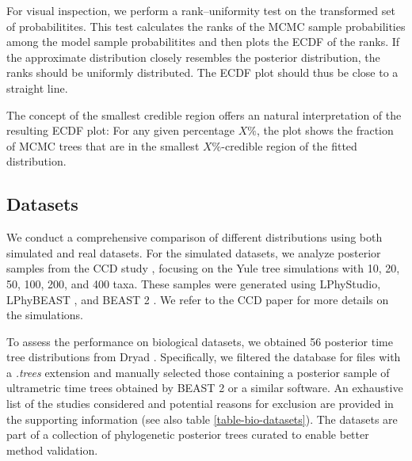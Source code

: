 \documentclass[10pt,letterpaper]{article}
\begin{document}
For visual inspection, we perform a rank–uniformity test \cite{bayesianmodelvalidation} on the transformed set of probabilitites. This test calculates the ranks of the MCMC sample probabilities among the model sample probabilitites and then plots the ECDF of the ranks. If the approximate distribution closely resembles the posterior distribution, the ranks should be uniformly distributed. The ECDF plot should thus be close to a straight line.

The concept of the smallest credible region offers an natural interpretation of the resulting ECDF plot: For any given percentage $X \%$, the plot shows the fraction of MCMC trees that are in the smallest $X \%$-credible region of the fitted distribution.


\subsection*{Datasets}

We conduct a comprehensive comparison of different distributions using both simulated and real datasets. For the simulated datasets, we analyze posterior samples from the CCD study \cite{ccddata}, focusing on the Yule tree simulations with 10, 20, 50, 100, 200, and 400 taxa. These samples were generated using LPhyStudio, LPhyBEAST \cite{linguaphylo}, and BEAST 2 \cite{beast2}. We refer to the CCD paper \cite{ccd} for more details on the simulations.

To assess the performance on biological datasets, we obtained 56 posterior time tree distributions from Dryad \cite{dryad}. Specifically, we filtered the database for files with a \emph{.trees} extension and manually selected those containing a posterior sample of ultrametric time trees obtained by BEAST 2 or a similar software. An exhaustive list of the studies considered and potential reasons for exclusion are provided in the supporting information (see also table \ref{table-bio-datasets}). The datasets are part of a collection of phylogenetic posterior trees \cite{phylotrees} curated to enable better method validation.
\end{document}
